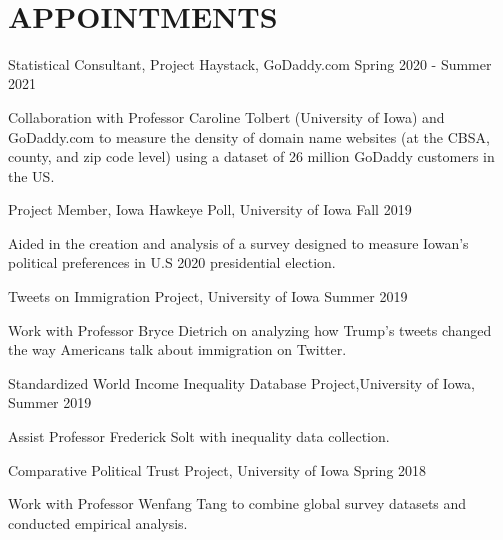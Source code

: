 \documentclass[10.5pt,]{article}
\providecommand{\tightlist}{%
	\setlength{\itemsep}{0pt}\setlength{\parskip}{0pt}}
\renewenvironment{itemize}{
	\begin{list}{}{
			\setlength{\leftmargin}{1.5em}
		}
	}{
	\end{list}
}
\begin{document}
 ~

 \hypertarget{appointments}{%
 \section{APPOINTMENTS}\label{appointments}}

 \begin{itemize}
 \tightlist
 \item
   Statistical Consultant, Project Haystack, GoDaddy.com \hfill Spring
   2020 - Summer 2021

   \begin{itemize}
   \tightlist
   \item
     Collaboration with Professor Caroline Tolbert (University of Iowa)
     and GoDaddy.com to measure the density of domain name websites (at
     the CBSA, county, and zip code level) using a dataset of 26 million
     GoDaddy customers in the US.
   \end{itemize}
 \item
   Project Member, Iowa Hawkeye Poll, University of Iowa \hfill Fall
   2019

   \begin{itemize}
   \tightlist
   \item
     Aided in the creation and analysis of a survey designed to measure
     Iowan's political preferences in U.S 2020 presidential election.
   \end{itemize}
 \item
   Tweets on Immigration Project, University of Iowa \hfill Summer 2019

   \begin{itemize}
   \tightlist
   \item
     Work with Professor Bryce Dietrich on analyzing how Trump's tweets
     changed the way Americans talk about immigration on Twitter.
   \end{itemize}
 \item
   Standardized World Income Inequality Database Project,University of
   Iowa, \hfill Summer 2019

   \begin{itemize}
   \tightlist
   \item
     Assist Professor Frederick Solt with inequality data collection.
   \end{itemize}
 \item
   Comparative Political Trust Project, University of Iowa \hfill Spring
   2018

   \begin{itemize}
   \tightlist
   \item
     Work with Professor Wenfang Tang to combine global survey datasets
     and conducted empirical analysis.
   \end{itemize}
 \end{itemize}
\end{document}
